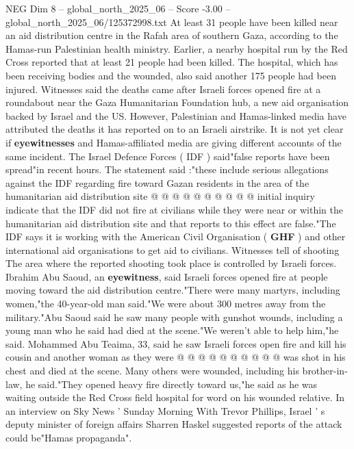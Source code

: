 \begin{textsample}{NEG Dim 8 – global\_north\_2025\_06 – Score -3.00 – global\_north\_2025\_06/125372998.txt}  \label{ex:f8_neg_029}
At least 31 people have been killed near an aid distribution centre in the Rafah area of southern Gaza, according to the Hamas-run Palestinian health ministry.
Earlier, a nearby hospital run by the Red Cross reported that at least 21 people had been killed.
The hospital, which has been receiving bodies and the wounded, also said another 175 people had been injured.
Witnesses said the deaths came after Israeli forces opened fire at a roundabout near the Gaza Humanitarian Foundation hub, a new aid organisation backed by Israel and the US.
However, Palestinian and Hamas-linked media have attributed the deaths it has reported on to an Israeli airstrike.
It is not yet clear if \textbf{eyewitnesses} and Hamas-affiliated media are giving different accounts of the same incident.
The Israel Defence Forces ( IDF ) said"false reports have been spread"in recent hours.
The statement said :"these include serious allegations against the IDF regarding fire toward Gazan residents in the area of the humanitarian aid distribution site @ @ @ @ @ @ @ @ @ @ initial inquiry indicate that the IDF did not fire at civilians while they were near or within the humanitarian aid distribution site and that reports to this effect are false."The IDF says it is working with the American Civil Organisation ( \textbf{GHF} ) and other international aid organisations to get aid to civilians.
Witnesses tell of shooting The area where the reported shooting took place is controlled by Israeli forces.
Ibrahim Abu Saoud, an \textbf{eyewitness}, said Israeli forces opened fire at people moving toward the aid distribution centre."There were many martyrs, including women,"the 40-year-old man said."We were about 300 metres away from the military."Abu Saoud said he saw many people with gunshot wounds, including a young man who he said had died at the scene."We weren't able to help him,"he said.
Mohammed Abu Teaima, 33, said he saw Israeli forces open fire and kill his cousin and another woman as they were @ @ @ @ @ @ @ @ @ @ was shot in his chest and died at the scene.
Many others were wounded, including his brother-in-law, he said."They opened heavy fire directly toward us,"he said as he was waiting outside the Red Cross field hospital for word on his wounded relative.
In an interview on Sky News ' Sunday Morning With Trevor Phillips, Israel ' s deputy minister of foreign affairs Sharren Haskel suggested reports of the attack could be"Hamas propaganda".

\end{textsample}
